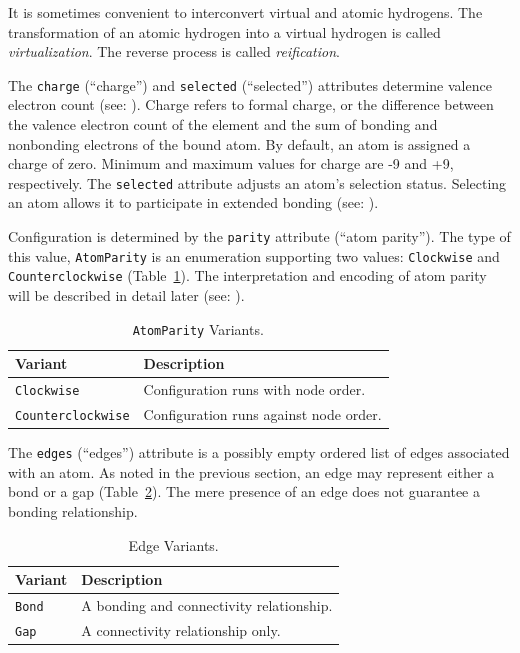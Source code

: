 \documentclass{article}
\def\ttt{\texttt}
\begin{document}
It is sometimes convenient to interconvert virtual and atomic hydrogens. The transformation of an atomic hydrogen into a virtual hydrogen is called \textit{virtualization}. The reverse process is called \textit{reification}.

The \ttt{charge} (\enquote{charge}) and \ttt{selected} (\enquote{selected}) attributes determine valence electron count (see: ). Charge refers to formal charge, or the difference between the valence electron count of the element and the sum of bonding and nonbonding electrons of the bound atom. By default, an atom is assigned a charge of zero. Minimum and maximum values for charge are -9 and +9, respectively. The \ttt{selected} attribute adjusts an atom's selection status. Selecting an atom allows it to participate in extended bonding (see: ).

Configuration is determined by the \ttt{parity} attribute (\enquote{atom parity}). The type of this value, \ttt{AtomParity} is an enumeration supporting two values: \ttt{Clockwise} and \ttt{Counterclockwise} (Table~\ref{table:atom-parity-variants}). The interpretation and encoding of atom parity will be described in detail later (see: ).

\begin{table}
\caption{\ttt{AtomParity} Variants.}
\centering
\begin{tabular}{l l}
    \hline
    Variant & Description  \\
    \hline
    \ttt{Clockwise} & Configuration runs with node order. \\
    \ttt{Counterclockwise} & Configuration runs against node order. \\
    \hline
\end{tabular}
\label{table:atom-parity-variants}
\end{table}

The \ttt{edges} (\enquote{edges}) attribute is a possibly empty ordered list of edges associated with an atom. As noted in the previous section, an edge may represent either a bond or a gap (Table~\ref{table:edge-variants}). The mere presence of an edge does not guarantee a bonding relationship.

\begin{table}
\caption{Edge Variants.}
\centering
\begin{tabular}{l l}
    \hline
    Variant & Description  \\
    \hline
    \ttt{Bond} & A bonding and connectivity relationship. \\
    \ttt{Gap} & A connectivity relationship only. \\
    \hline
\end{tabular}
\label{table:edge-variants}
\end{table}
\end{document}
